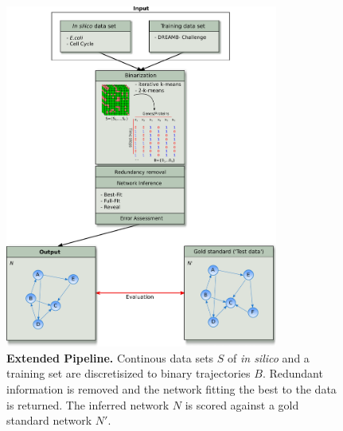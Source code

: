 

\begin{figure}[H]
\captionsetup{width=0.9\linewidth}
\centering
\includegraphics[width=0.8\textwidth]{./Bilder/Extended_pipeline.pdf}
\caption[Extended Pipeline]{\textbf{Extended Pipeline.} Continous data sets $S$ of \textit{in silico} and a training set are discretisized to binary trajectories $B$. Redundant information is removed and the network fitting the best to the data is returned. The inferred network $N$ is scored against a gold standard network $N'$. }
\label{fig:General Pipeline}
\end{figure} 

